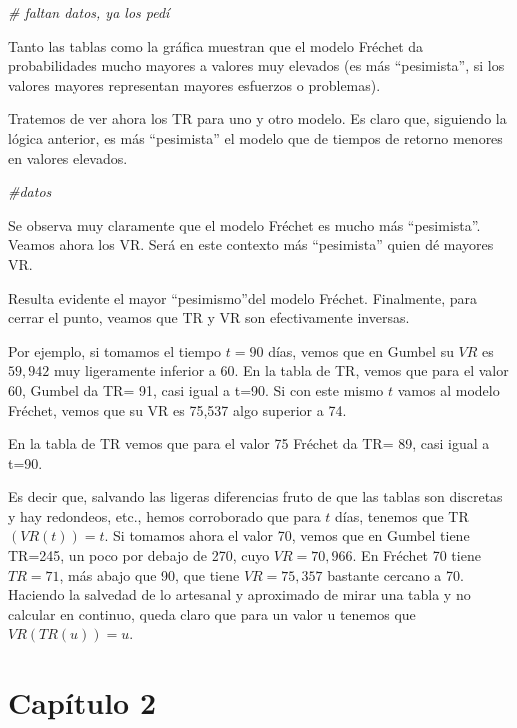 \documentclass[
  oneside]{book}
\newenvironment{Shaded}{\begin{snugshade}}{\end{snugshade}}
\newcommand{\CommentTok}[1]{\textcolor[rgb]{0.56,0.35,0.01}{\textit{#1}}}
\begin{document}
\begin{Shaded}
\begin{Highlighting}[]
\CommentTok{\# faltan datos, ya los pedí}
\end{Highlighting}
\end{Shaded}

Tanto las tablas como la gráfica muestran que el modelo Fréchet da
probabilidades mucho mayores a valores muy elevados (es más
``pesimista'', si los valores mayores representan mayores esfuerzos o
problemas).

Tratemos de ver ahora los TR para uno y otro modelo. Es claro que,
siguiendo la lógica anterior, es más ``pesimista'' el modelo que de
tiempos de retorno menores en valores elevados.

\begin{Shaded}
\begin{Highlighting}[]
\CommentTok{\#datos}
\end{Highlighting}
\end{Shaded}

Se observa muy claramente que el modelo Fréchet es mucho más
``pesimista''. Veamos ahora los VR. Será en este contexto más
``pesimista'' quien dé mayores VR.

Resulta evidente el mayor ``pesimismo''del modelo Fréchet. Finalmente,
para cerrar el punto, veamos que TR y VR son efectivamente inversas.

Por ejemplo, si tomamos el tiempo \(t=90\) días, vemos que en Gumbel su
\(VR\) es \(59,942\) muy ligeramente inferior a 60. En la tabla de TR,
vemos que para el valor 60, Gumbel da TR= 91, casi igual a t=90. Si con
este mismo \(t\) vamos al modelo Fréchet, vemos que su VR es 75,537 algo
superior a 74.

En la tabla de TR vemos que para el valor 75 Fréchet da TR= 89, casi
igual a t=90.

Es decir que, salvando las ligeras diferencias fruto de que las tablas
son discretas y hay redondeos, etc., hemos corroborado que para \(t\)
días, tenemos que TR \((VR(t))=t\). Si tomamos ahora el valor 70, vemos
que en Gumbel tiene TR=245, un poco por debajo de 270, cuyo
\(VR=70,966\). En Fréchet 70 tiene \(TR=71\), más abajo que 90, que
tiene \(VR= 75,357\) bastante cercano a 70. Haciendo la salvedad de lo
artesanal y aproximado de mirar una tabla y no calcular en continuo,
queda claro que para un valor u tenemos que \(VR(TR(u))=u\).

\newpage
\chapter{Capítulo 2}
\end{document}
